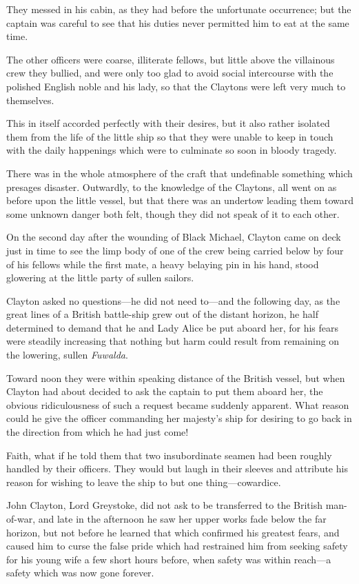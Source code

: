 They messed in his cabin, as they had before the unfortunate occurrence; but the captain was careful to see that his duties never permitted him to eat at the same time.

The other officers were coarse, illiterate fellows, but little above the villainous crew they bullied, and were only too glad to avoid social intercourse with the polished English noble and his lady, so that the Claytons were left very much to themselves.

This in itself accorded perfectly with their desires, but it also rather isolated them from the life of the little ship so that they were unable to keep in touch with the daily happenings which were to culminate so soon in bloody tragedy.

There was in the whole atmosphere of the craft that undefinable something which presages disaster. Outwardly, to the knowledge of the Claytons, all went on as before upon the little vessel, but that there was an undertow leading them toward some unknown danger both felt, though they did not speak of it to each other.

On the second day after the wounding of Black Michael, Clayton came on deck just in time to see the limp body of one of the crew being carried below by four of his fellows while the first mate, a heavy belaying pin in his hand, stood glowering at the little party of sullen sailors.

Clayton asked no questions—he did not need to—and the following day, as the great lines of a British battle-ship grew out of the distant horizon, he half determined to demand that he and Lady Alice be put aboard her, for his fears were steadily increasing that nothing but harm could result from remaining on the lowering, sullen \emph{Fuwalda}.

Toward noon they were within speaking distance of the British vessel, but when Clayton had about decided to ask the captain to put them aboard her, the obvious ridiculousness of such a request became suddenly apparent. What reason could he give the officer commanding her majesty’s ship for desiring to go back in the direction from which he had just come!

Faith, what if he told them that two insubordinate seamen had been roughly handled by their officers. They would but laugh in their sleeves and attribute his reason for wishing to leave the ship to but one thing—cowardice.

John Clayton, Lord Greystoke, did not ask to be transferred to the British man-of-war, and late in the afternoon he saw her upper works fade below the far horizon, but not before he learned that which confirmed his greatest fears, and caused him to curse the false pride which had restrained him from seeking safety for his young wife a few short hours before, when safety was within reach—a safety which was now gone forever.

